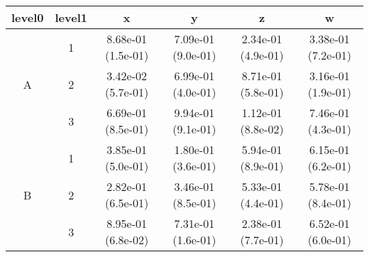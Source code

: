 \begin{tabular}{cccccc}
\toprule
level0 & level1&x&y&z&w\tabularnewline
\midrule
\multirow{3}{*}{A}&1& 8.68e-01 (1.5e-01)& 7.09e-01 (9.0e-01)& 2.34e-01 (4.9e-01)& 3.38e-01 (7.2e-01)\tabularnewline
&2& 3.42e-02 (5.7e-01)& 6.99e-01 (4.0e-01)& 8.71e-01 (5.8e-01)& 3.16e-01 (1.9e-01)\tabularnewline
&3& 6.69e-01 (8.5e-01)& 9.94e-01 (9.1e-01)& 1.12e-01 (8.8e-02)& 7.46e-01 (4.3e-01)\tabularnewline
\midrule
\multirow{3}{*}{B}&1& 3.85e-01 (5.0e-01)& 1.80e-01 (3.6e-01)& 5.94e-01 (8.9e-01)& 6.15e-01 (6.2e-01)\tabularnewline
&2& 2.82e-01 (6.5e-01)& 3.46e-01 (8.5e-01)& 5.33e-01 (4.4e-01)& 5.78e-01 (8.4e-01)\tabularnewline
&3& 8.95e-01 (6.8e-02)& 7.31e-01 (1.6e-01)& 2.38e-01 (7.7e-01)& 6.52e-01 (6.0e-01)\tabularnewline
\bottomrule
\end{tabular}
